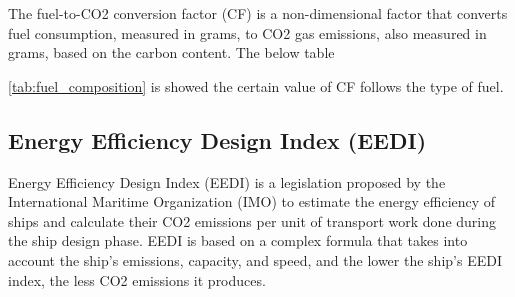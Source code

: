 The fuel-to-CO2 conversion factor (CF) is a non-dimensional factor that converts fuel consumption, measured in grams, to CO2 gas emissions, also measured in grams, based on the carbon content.
The below table

\ref{tab:fuel_composition} is showed the certain value of CF follows the type of fuel.

\begin{table}[h]
    \centering
    \caption{The value of CF (t-CO2/t-Fuel) \autocite{tran2017research}.}
    \label{tab:fuel_composition}
\end{table}

\subsection{Energy Efficiency Design Index  (EEDI)}


Energy Efficiency Design Index (EEDI) is a legislation proposed by the International Maritime Organization (IMO) to estimate the energy efficiency of ships and calculate their CO2 emissions per unit of transport work done during the ship design phase.
EEDI is based on a complex formula that takes into account the ship's emissions, capacity, and speed, and the lower the ship's EEDI index, the less CO2 emissions it produces.

